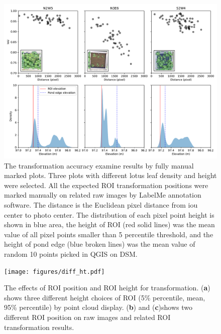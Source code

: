\documentclass{configs/bmcart}
\begin{document}
\begin{backmatter}
\begin{figure}[!htb]
  \includegraphics[width=0.95\linewidth]{figures/dist.pdf}
  \caption{The transformation accuracy examine results by fully manual marked plots. Three plots with different lotus leaf density and height were selected. All the expected ROI transformation positions were marked manually on related raw images by LabelMe annotation software. The distance is the Euclidean pixel distance from \acrfull*{iou} center to photo center. The distribution of each pixel point height is shown in blue area, the height of ROI (red solid lines) was the mean value of all pixel points smaller than 5 percentile threshold, and the height of pond edge (blue broken lines) was the mean value of random 10 points picked in QGIS on DSM.}
  \label{fig:dist}
\end{figure}

\begin{figure}[!htb]
  \texttt{[image: figures/diff\_ht.pdf]}
  \caption{The effects of ROI position and ROI height for transformation. (\textbf{a}) shows three different height choices of ROI (5\% percentile, mean, 95\% percentile) by point cloud display. (\textbf{b}) and (\textbf{c})shows two different ROI position on raw images and related ROI transformation results.}
  \label{fig:ht_diff}
\end{figure}


\end{backmatter}
\end{document}
